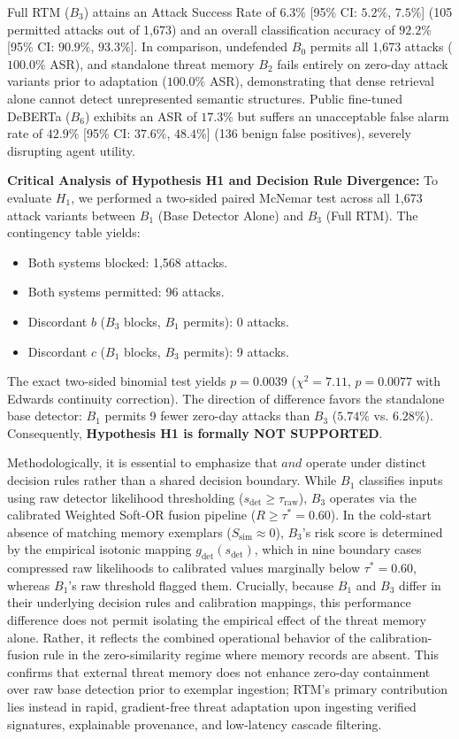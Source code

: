 \documentclass[conference]{IEEEtran}
\begin{document}
Full RTM ($B_3$) attains an Attack Success Rate of $6.3\%$ [95\% CI: $5.2\%$, $7.5\%$] (105 permitted attacks out of 1,673) and an overall classification accuracy of $92.2\%$ [95\% CI: $90.9\%$, $93.3\%$]. In comparison, undefended $B_0$ permits all 1,673 attacks ($100.0\%$ ASR), and standalone threat memory $B_2$ fails entirely on zero-day attack variants prior to adaptation ($100.0\%$ ASR), demonstrating that dense retrieval alone cannot detect unrepresented semantic structures. Public fine-tuned DeBERTa ($B_6$) exhibits an ASR of $17.3\%$ but suffers an unacceptable false alarm rate of $42.9\%$ [95\% CI: $37.6\%$, $48.4\%$] (136 benign false positives), severely disrupting agent utility.

\noindent\textbf{Critical Analysis of Hypothesis H1 and Decision Rule Divergence:}
To evaluate $H_1$, we performed a two-sided paired McNemar test across all 1,673 attack variants between $B_1$ (Base Detector Alone) and $B_3$ (Full RTM). The contingency table yields:
\begin{itemize}
    \item Both systems blocked: 1,568 attacks.
    \item Both systems permitted: 96 attacks.
    \item Discordant $b$ ($B_3$ blocks, $B_1$ permits): 0 attacks.
    \item Discordant $c$ ($B_1$ blocks, $B_3$ permits): 9 attacks.
\end{itemize}
The exact two-sided binomial test yields $p = 0.0039$ ($\chi^2 = 7.11$, $p = 0.0077$ with Edwards continuity correction). The direction of difference favors the standalone base detector: $B_1$ permits 9 fewer zero-day attacks than $B_3$ ($5.74\%$ vs. $6.28\%$). Consequently, \textbf{Hypothesis H1 is formally NOT SUPPORTED}.

Methodologically, it is essential to emphasize that $ and $ operate under distinct decision rules rather than a shared decision boundary. While $B_1$ classifies inputs using raw detector likelihood thresholding ($s_{\text{det}} \ge \tau_{\text{raw}}$), $B_3$ operates via the calibrated Weighted Soft-OR fusion pipeline ($R \ge \tau^* = 0.60$). In the cold-start absence of matching memory exemplars ($S_{\text{sim}} \approx 0$), $B_3$'s risk score is determined by the empirical isotonic mapping $g_{\text{det}}(s_{\text{det}})$, which in nine boundary cases compressed raw likelihoods to calibrated values marginally below $\tau^* = 0.60$, whereas $B_1$'s raw threshold flagged them. Crucially, because $B_1$ and $B_3$ differ in their underlying decision rules and calibration mappings, this performance difference does not permit isolating the empirical effect of the threat memory alone. Rather, it reflects the combined operational behavior of the calibration-fusion rule in the zero-similarity regime where memory records are absent. This confirms that external threat memory does not enhance zero-day containment over raw base detection prior to exemplar ingestion; RTM's primary contribution lies instead in rapid, gradient-free threat adaptation upon ingesting verified signatures, explainable provenance, and low-latency cascade filtering.
\end{document}
